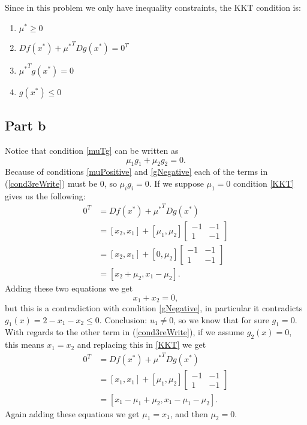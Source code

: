 \documentclass{article}
\begin{document}
Since in this problem we only have inequality constraints, the KKT condition
is:
\begin{enumerate}[I]
\item $\mu^*\geq0$ \label{muPositive}
\item $Df(x^*)+{\mu^*}^TDg(x^*)=0^T$ \label{KKT}
\item ${\mu^*}^Tg(x^*)=0$ \label{muTg}
\item $g(x^*)\leq0$ \label{gNegative}
\end{enumerate}
\subsection*{Part b}
Notice that condition \ref{muTg} can be written as
\begin{equation} \label{cond3reWrite}
\mu_1g_1 + \mu_2g_2=0.
\end{equation}
Because of conditions \ref{muPositive} and \ref{gNegative} each of the
terms in (\ref{cond3reWrite}) must be 0, so $\mu_ig_i=0$.
If we suppose $\mu_1=0$ condition \ref{KKT} gives us the following:
\begin{align*}
0^T&=Df(x^*)+{\mu^*}^TDg(x^*)\\
&=[x_2,x_1]+[\mu_1,\mu_2]\begin{bmatrix}
-1 & -1\\
1 & -1
\end{bmatrix}\\
&=[x_2,x_1]+[0,\mu_2]\begin{bmatrix}
-1 & -1\\
1 & -1
\end{bmatrix}\\
&=[ x_2+\mu_2, x_1-\mu_2].
\end{align*}
Adding these two equations we get
\[
x_1+x_2=0,
\]
but this is a contradiction with condition \ref{gNegative}, in particular it
contradicts $g_1(x)=2-x_1-x_2\leq0$. Conclusion: $u_1\neq 0$, so we know that
for sure $g_1=0$.
With regards to the other term in (\ref{cond3reWrite}), if we assume
$g_2(x)=0$, this means $x_1=x_2$ and replacing this in \ref{KKT} we
get
\begin{align*}
0^T&=Df(x^*)+{\mu^*}^TDg(x^*)\\
&=[x_1,x_1]+[\mu_1,\mu_2]\begin{bmatrix}
-1 & -1\\
1 & -1
\end{bmatrix}\\
&=[ x_1-\mu_1+\mu_2, x_1-\mu_1-\mu_2].
\end{align*}
Again adding these equations we get $\mu_1=x_1$, and then $\mu_2=0$.
\end{document}
